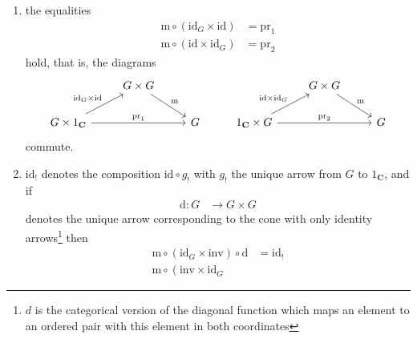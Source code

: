 \begin{exa}
\begin{enumerate}
\begin{enumerate}
\begin{align*}
  \left(
    G
    \times
    G
  \right)
  \times
  G
  &\cong
  G
  \times
  \left(
    G
    \times
    G
  \right)
\end{align*}
holds, that is, the diagram
\[
\begin{tikzcd}[sep=normal]
  (G \times G)
  \times
  G
  \arrow{rr}{\Phi}
  \arrow[swap]{d}{\mathrm{m} \times \mathrm{id}_{G}}
  &
  &
  G
  \times
  (G \times G)
  \arrow{d}{\mathrm{id}_{G} \times \mathrm{m}}
  \\
  G
  \times
  G
  \arrow[swap]{dr}{\mathrm{m}}
  &
  &
  G
  \times
  G
  \arrow{dl}{\mathrm{m}}
  \\
  &
  G
  &
\end{tikzcd}
\]
commutes.
\item[(GO2)]
the equalities
\begin{align*}
  \mathrm{m}
  \circ
  \left(
    \mathrm{id}_{G}
    \times
    \mathrm{id}
  \right)
  &=
  \mathrm{pr}_{1}
  \\
  \mathrm{m}
  \circ
  \left(
    \mathrm{id}
    \times
    \mathrm{id}_{G}
  \right)
  &=
  \mathrm{pr}_{2}
\end{align*}
hold, that is, the diagrams
\[
\begin{tikzcd}[sep=normal]
  &
  G
  \times
  G
  \arrow{dr}{\mathrm{m}}
  &
  &
  &
  G
  \times
  G
  \arrow{dr}{\mathrm{m}}
  &
  \\
  G
  \times
  1_{\mathbf{C}}
  \arrow{ur}{\mathrm{id}_{G} \times \mathrm{id}}
  \arrow{rr}{\mathrm{pr}_{1}}
  &
  &
  G
  &
  1_{\mathbf{C}}
  \times
  G
  \arrow{ur}{\mathrm{id} \times \mathrm{id}_{G}}
  \arrow{rr}{\mathrm{pr}_{2}}
  &
  &
  G
\end{tikzcd}
\]
commute.
\item[(GO3)]
$\mathrm{id}_{!}$ denotes the composition $\mathrm{id} \circ g_{!}$ with $g_{!}$ the unique arrow from $G$ to $1_{\mathbf{C}}$, and if
\begin{align*}
  \mathrm{d}
  \colon
  G
  &\rightarrow
  G
  \times
  G
\end{align*}
denotes the unique arrow corresponding to the cone with only identity arrows\footnote{$d$ is the categorical version of the diagonal function which maps an element to an ordered pair with this element in both coordinates} then
\begin{align*}
  \mathrm{m}
  \circ
  \left(
    \mathrm{id}_{G}
    \times
    \mathrm{inv}
  \right)
  \circ
  \mathrm{d}
  &=
  \mathrm{id}_{!}
  \\
  \mathrm{m}
  \circ
  \left(
    \mathrm{inv}
    \times
    \mathrm{id}_{G}

\end{align*}
\end{enumerate}
\end{enumerate}
\end{exa}
